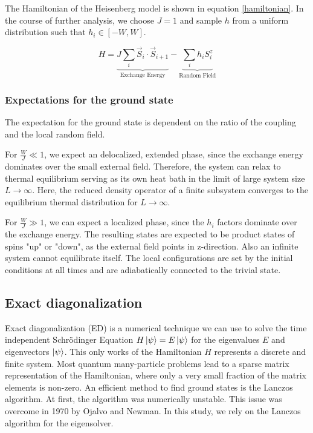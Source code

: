 \documentclass[reprint,amsmath,amssymb,aps,prb]{revtex4-2}
\begin{document}
The Hamiltonian of the Heisenberg model is shown in equation \ref{hamiltonian}. In the course of further analysis, we choose $J=1$ and sample $h$ from a uniform distribution such that $h_i \in \left[-W, W\right]$.

\begin{equation}
	H=\underbrace{J\sum_i \vec{S}_i\cdot\vec{S}_{i+1}}_{\text{Exchange Energy}}-\underbrace{\sum_ih_iS_i^z}_{\text{Random Field}}\label{hamiltonian}
\end{equation}


\subsubsection{Expectations for the ground state}

The expectation for the ground state is dependent on the ratio of the coupling and the local random field. 

For $\frac{W}{J} \ll 1$, we expect an delocalized, extended phase, since the exchange energy dominates over the small external field. Therefore, the system can relax to thermal equilibrium serving as its own heat bath in the limit of large system size $L\rightarrow\infty$.
Here, the reduced density operator of a finite subsystem converges to the equilibrium thermal distribution
for $L\rightarrow\infty$.\cite{Pal2010}

For $\frac{W}{J} \gg 1$, we can expect a localized phase, since the $h_i$ factors dominate over the exchange energy. The resulting states are expected to be product states of spins "up" or "down", as the external field points in z-direction. Also an infinite system cannot equilibrate itself. The local configurations are set by the initial conditions at all times and are adiabatically connected to the trivial state.\cite{Pal2010}

\subsection{Exact diagonalization}

Exact diagonalization (ED) is a numerical technique we can use to solve the time independent Schrödinger Equation $H\ket{\psi}=E\ket{\psi}$ for the eigenvalues $E$ and eigenvectors $\ket{\psi}$. This only works of the Hamiltonian $H$ represents a discrete and finite system. Most quantum many-particle problems lead to a sparse matrix representation of the Hamiltonian, where only a very small fraction of the matrix
elements is non-zero.\cite{Weisse2008} An efficient method to find ground states is the Lanczos algorithm.\cite{Lanczos1950} At first, the algorithm was numerically unstable. This issue was overcome in 1970 by Ojalvo and Newman.\cite{Ojalvo1970} In this study, we rely on the Lanczos algorithm for the eigensolver.
\end{document}
